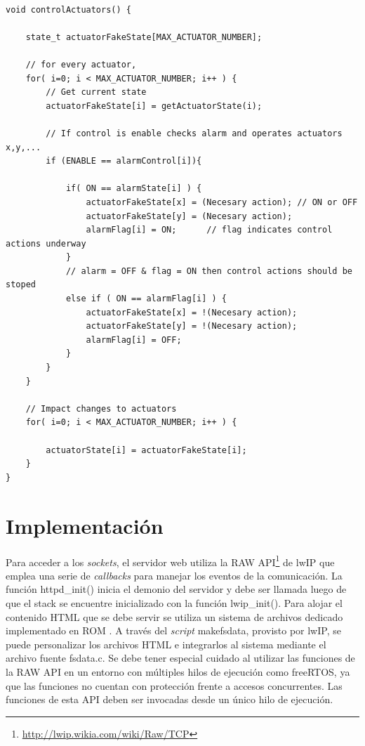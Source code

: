 \vspace{10px}
\begin{lstlisting}[caption=Pseudocódigo del control de los actuadores.]  % Start your code-block

void controlActuators() {

	state_t actuatorFakeState[MAX_ACTUATOR_NUMBER];
	
	// for every actuator, 
	for( i=0; i < MAX_ACTUATOR_NUMBER; i++ ) {
		// Get current state
		actuatorFakeState[i] = getActuatorState(i);
		
		// If control is enable checks alarm and operates actuators x,y,...
		if (ENABLE == alarmControl[i]){
		
			if( ON == alarmState[i] ) {
				actuatorFakeState[x] = (Necesary action); // ON or OFF
				actuatorFakeState[y] = (Necesary action);
				alarmFlag[i] = ON;		// flag indicates control actions underway
			}
			// alarm = OFF & flag = ON then control actions should be stoped
			else if ( ON == alarmFlag[i] ) {
				actuatorFakeState[x] = !(Necesary action);
				actuatorFakeState[y] = !(Necesary action);
				alarmFlag[i] = OFF;
			}			
		}
	}
	
	// Impact changes to actuators
	for( i=0; i < MAX_ACTUATOR_NUMBER; i++ ) {

		actuatorState[i] = actuatorFakeState[i];
	}	
}
\end{lstlisting}

\clearpage
\section{Implementación}

Para acceder a los \textit{sockets}, el servidor web utiliza la RAW API\footnote{\url{http://lwip.wikia.com/wiki/Raw/TCP}} de lwIP que emplea una serie de \textit{callbacks} para manejar los eventos de la comunicación.  La función httpd\_init() inicia el demonio del servidor y debe ser llamada luego de que el stack se encuentre inicializado con la función lwip\_init().  Para alojar el contenido HTML que se debe servir se utiliza un sistema de archivos dedicado implementado en ROM \citep{webserver}. A través del \textit{script} makefsdata, provisto por lwIP, se puede personalizar los archivos HTML e integrarlos al sistema mediante el archivo fuente fsdata.c.  Se debe tener especial cuidado al utilizar las funciones de la RAW API en un entorno con múltiples hilos de ejecución como freeRTOS, ya que las funciones no cuentan con protección frente a accesos concurrentes.  Las funciones de esta API deben ser invocadas desde un único hilo de ejecución.


